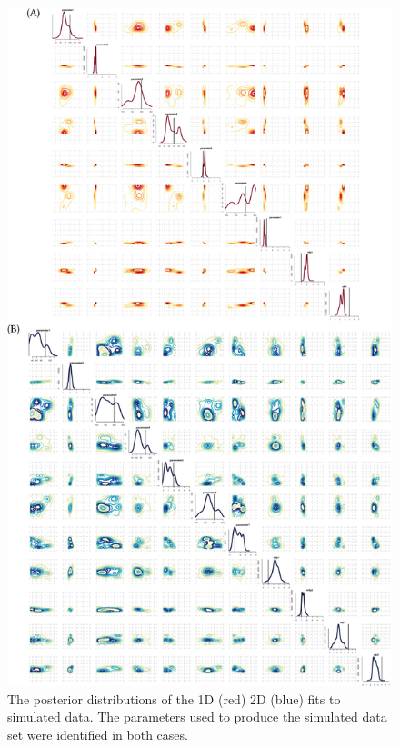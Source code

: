 \begin{figure}[htbp]
\centering
	\includegraphics[scale=0.7]{../../chapters/chapterABCFlow/images/toy_model_posteriors.png}
	\caption[LoF caption]{\label{fig:1d2d-sim-post}The posterior distributions of the 1D (red) 2D (blue) fits to simulated data. The parameters used to produce the simulated data set were identified in both cases.}
\end{figure}




